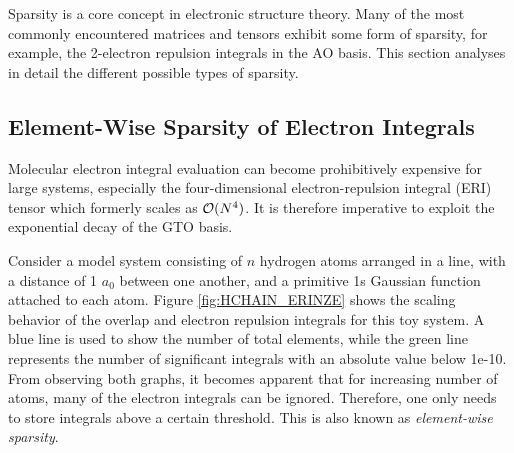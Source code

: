 Sparsity is a core concept in electronic structure theory. Many of the most commonly encountered matrices and tensors exhibit some form of sparsity, for example, the 2-electron repulsion integrals in the AO basis. This section analyses in detail the different possible types of sparsity.

\FloatBarrier

\subsection{Element-Wise Sparsity of Electron Integrals}

Molecular electron integral evaluation can become prohibitively expensive for large systems, especially the four-dimensional electron-repulsion integral (ERI) tensor which formerly scales as $\mathcal{O}(N^{4})$. It is therefore imperative to exploit the exponential decay of the GTO basis.

Consider a model system consisting of $n$ hydrogen atoms arranged in a line, with a distance of 1 $a_0$ between one another, and a primitive 1s Gaussian function attached to each atom. Figure \ref{fig:HCHAIN_ERINZE} shows the scaling behavior of the overlap and electron repulsion integrals for this toy system. A blue line is used to show the number of total elements, while the green line represents the number of significant integrals with an absolute value below 1e-10. From observing both graphs, it becomes apparent that for increasing number of atoms, many of the electron integrals can be ignored. Therefore, one only needs to store integrals above a certain threshold. This is also known as \emph{element-wise sparsity}.


